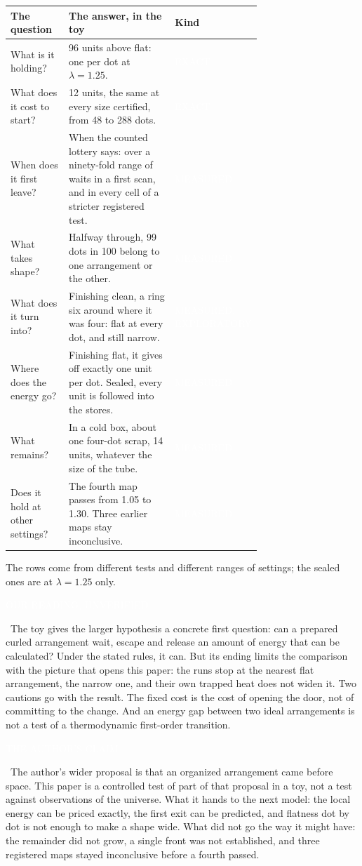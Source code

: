\documentclass[11pt,letterpaper]{article}
\newcommand{\sub}[1]{\par\medskip{\color{ink}\large\bfseries #1}\par}
\newcommand{\tagbox}[2]{{\sffamily\scriptsize\colorbox{#1}{\textcolor{white}{\strut #2}}}}
\newcommand{\Exact}{\tagbox{kExact}{EXACT}}
\newcommand{\Meas}{\tagbox{kMeas}{MEASURED}}
\newcommand{\MeasX}{\tagbox{kMeas}{MEASURED, EXPLORATORY}}
\newcommand{\Ours}{\tagbox{kOurs}{OUR READING, UNVERIFIED}}
\newcommand{\Claim}{\tagbox{kClaim}{THE AUTHOR'S CLAIM}}
\begin{document}
\begin{center}
\renewcommand{\arraystretch}{1.25}
\begin{tabular}{@{}p{0.24\linewidth}p{0.47\linewidth}l@{}}
\toprule
The question & The answer, in the toy & Kind \\
\midrule
What is it holding? & 96 units above flat: one per dot at $\lambda=1.25$. & \Exact \\
What does it cost to start? & 12 units, the same at every size certified, from 48 to 288 dots. & \Exact \\
When does it first leave? & When the counted lottery says: over a ninety-fold range of waits in a first scan, and in every cell of a stricter registered test. & \Meas \\
What takes shape? & Halfway through, 99 dots in 100 belong to one arrangement or the other. & \Meas \\
What does it turn into? & Finishing clean, a ring six around where it was four: flat at every dot, and still narrow. & \MeasX \\
Where does the energy go? & Finishing flat, it gives off exactly one unit per dot. Sealed, every unit is followed into the stores. & \Meas \\
What remains? & In a cold box, about one four-dot scrap, 14 units, whatever the size of the tube. & \Meas \\
Does it hold at other settings? & The fourth map passes from 1.05 to 1.30. Three earlier maps stay inconclusive. & \Meas \\
\bottomrule
\end{tabular}
\end{center}

The rows come from different tests and different ranges of settings; the sealed ones are at
$\lambda=1.25$ only.

\sub{What the toy shows, and where it stops}
\Ours\ The toy gives the larger hypothesis a concrete first question: can a prepared curled
arrangement wait, escape and release an amount of energy that can be calculated? Under the stated
rules, it can. But its ending limits the comparison with the picture that opens this paper: the runs
stop at the nearest flat arrangement, the narrow one, and their own trapped heat does not widen it.
Two cautions go with the result. The fixed cost is the cost of opening the door, not of committing to
the change. And an energy gap between two ideal arrangements is not a test of a thermodynamic
first-order transition.

\Claim\ The author's wider proposal is that an organized arrangement came before space. This paper is a
controlled test of part of that proposal in a toy, not a test against observations of the universe.
What it hands to the next model: the local energy can be priced exactly, the first exit can be
predicted, and flatness dot by dot is not enough to make a shape wide. What did not go the way it
might have: the remainder did not grow, a single front was not established, and three registered maps
stayed inconclusive before a fourth passed.
\end{document}
